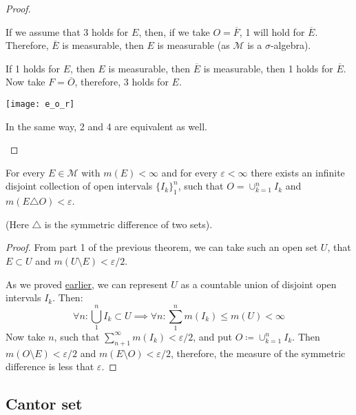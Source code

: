 \begin{proof}
\begin{itemize}
{            If we assume that 3 holds for $E$, then, if we take $O = \overline{F}$,
            1 will hold for $\overline{E}$.
            Therefore, $\overline{E}$ is measurable, then $E$ is measurable
            (as $\mathcal{M}$ is a $\sigma$-algebra).

            If 1 holds for $E$, then $E$ is measurable, then $\overline{E}$ is measurable, then 1 holds for 
            $\overline{E}$. Now take $F = \overline{O}$, therefore, 3 holds for $E$.

            \begin{figure*}[h]
                \centering
                \texttt{[image: e\_o\_r]}
            \end{figure*}

            In the same way, 2 and 4 are equivalent as well.
        }
    \end{itemize}
\end{proof}

\begin{theorem}
    For every $E \in \mathcal{M}$ with $m(E) < \infty$ and for every
    $\varepsilon < \infty$ there exists an infinite disjoint collection of open intervals
    $\{I_k\}_1^n$, such that $O = \cup_{k=1}^n I_k$ and $m(E \triangle O) < \varepsilon$.

    (Here $\triangle$ is the symmetric difference of two sets).
\end{theorem}
\begin{proof}
    From part 1 of the previous theorem,
    we can take such an open set $U$, that $E \subset U$ and $m(U \setminus E) < \varepsilon / 2$. 
    
    As we proved \hyperref[prop:bIsSmallestSigmaAlgebra]{earlier}, 
    we can represent $U$ as a countable union of disjoint open intervals $I_k$. Then:
    \[
        \forall n: \bigcup_1^n I_k \subset U \implies \forall n:
        \sum_1^n m(I_k) \le m(U) < \infty
    \]
    Now take $n$, such that $\sum_{n+1}^\infty m(I_k) < \varepsilon / 2$, and put
    $O \coloneqq \cup_{k=1}^n I_k$.
    Then $m(O \setminus E) < \varepsilon / 2$ and $m(E \setminus O) < \varepsilon / 2$,
    therefore, the measure of the symmetric difference is less that $\varepsilon$.
\end{proof}

\subsection{Cantor set}

